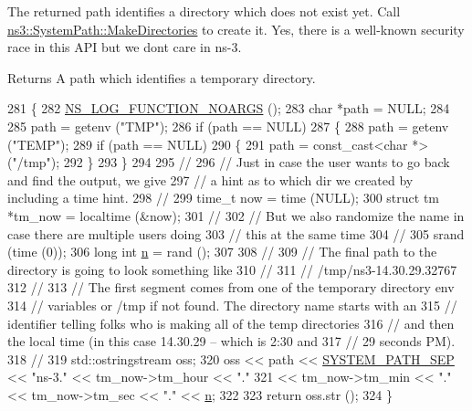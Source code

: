 The returned path identifies a directory which does not exist yet. Call \hyperlink{group__systempath_ga9529f7530ba5d513c8811acc15743d24}{ns3\+::\+System\+Path\+::\+Make\+Directories} to create it. Yes, there is a well-\/known security race in this A\+PI but we don\textquotesingle{}t care in ns-\/3.

\begin{DoxyReturn}{Returns}
A path which identifies a temporary directory. 
\end{DoxyReturn}

\begin{DoxyCode}
281 \{
282   \hyperlink{log-macros-disabled_8h_a8f7e4afc291c9d29a65c18ac1f79197b}{NS\_LOG\_FUNCTION\_NOARGS} ();
283   \textcolor{keywordtype}{char} *path = NULL;
284 
285   path = getenv (\textcolor{stringliteral}{"TMP"});
286   \textcolor{keywordflow}{if} (path == NULL)
287     \{
288       path = getenv (\textcolor{stringliteral}{"TEMP"});
289       \textcolor{keywordflow}{if} (path == NULL)
290         \{
291           path = \textcolor{keyword}{const\_cast<}\textcolor{keywordtype}{char} *\textcolor{keyword}{>} (\textcolor{stringliteral}{"/tmp"});
292         \}
293     \}
294 
295   \textcolor{comment}{//}
296   \textcolor{comment}{// Just in case the user wants to go back and find the output, we give}
297   \textcolor{comment}{// a hint as to which dir we created by including a time hint.}
298   \textcolor{comment}{//}
299   time\_t now = time (NULL);
300   \textcolor{keyword}{struct }tm *tm\_now = localtime (&now);
301   \textcolor{comment}{//}
302   \textcolor{comment}{// But we also randomize the name in case there are multiple users doing}
303   \textcolor{comment}{// this at the same time}
304   \textcolor{comment}{//}
305   srand (time (0));
306   \textcolor{keywordtype}{long} \textcolor{keywordtype}{int} \hyperlink{namespacesample-rng-plot_aeb5ee5c431e338ef39b7ac5431242e1d}{n} = rand ();
307 
308   \textcolor{comment}{//}
309   \textcolor{comment}{// The final path to the directory is going to look something like}
310   \textcolor{comment}{// }
311   \textcolor{comment}{//   /tmp/ns3-14.30.29.32767}
312   \textcolor{comment}{//}
313   \textcolor{comment}{// The first segment comes from one of the temporary directory env }
314   \textcolor{comment}{// variables or /tmp if not found.  The directory name starts with an}
315   \textcolor{comment}{// identifier telling folks who is making all of the temp directories}
316   \textcolor{comment}{// and then the local time (in this case 14.30.29 -- which is 2:30 and}
317   \textcolor{comment}{// 29 seconds PM).}
318   \textcolor{comment}{//}
319   std::ostringstream oss;
320   oss << path << \hyperlink{system-path_8cc_ae6764c655849cd2f06e112ac5222a99c}{SYSTEM\_PATH\_SEP} << \textcolor{stringliteral}{"ns-3."} << tm\_now->tm\_hour << \textcolor{stringliteral}{"."}
321       << tm\_now->tm\_min << \textcolor{stringliteral}{"."} << tm\_now->tm\_sec << \textcolor{stringliteral}{"."} << \hyperlink{namespacesample-rng-plot_aeb5ee5c431e338ef39b7ac5431242e1d}{n};
322 
323   \textcolor{keywordflow}{return} oss.str ();
324 \}
\end{DoxyCode}


